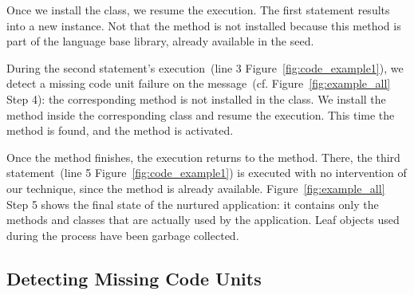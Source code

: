 
Once we install the  class, we resume the execution. The first statement results into a new  instance. Not that the  method is not installed because this method is part of the language base library, already available in the seed. 

During the second statement's execution~(line 3 Figure~\ref{fig:code_example1}), we detect a missing code unit failure on the  message~(cf. Figure~\ref{fig:example_all} Step 4): the corresponding method is not installed in the  class. We install the method inside the corresponding class and resume the execution. This time the method is found, and the  method is activated.



Once the  method finishes, the execution returns to the  method. There, the third statement~(line 5 Figure~\ref{fig:code_example1}) is executed with no intervention of our technique, since the  method is already available. Figure~\ref{fig:example_all} Step 5 shows the final state of the nurtured application: it contains only the methods and classes that are actually used by the application. Leaf objects used during the process have been garbage collected.


\subsection{Detecting Missing Code Units}\label{sec:model_detail}


